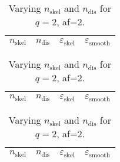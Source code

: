 \documentclass[11pt, oneside]{article}   	%
\newcommand\nskel{n_{\textrm{skel}}}
\newcommand\ndis{n_{\textrm{dis}}}
\newcommand\eskel{\varepsilon_{\textrm{skel}}}
\newcommand\esmooth{\varepsilon_{\textrm{smooth}}}
\begin{document}
\begin{table}[!ht]
\begin{minipage}{.3\linewidth}
\caption{$\lambda = 2.5$}
\centering
{\tiny
\begin{tabular}{|c|c|c|c|}
\hline
$\nskel$ & $\ndis$ & $\eskel$ & $\esmooth$ \\ \hline

\end{tabular}
}
\end{minipage} \hspace{3ex} 
\begin{minipage}{.3\linewidth}
\caption{$\lambda = 5$}
\centering
{\tiny
\begin{tabular}{|c|c|c|c|}
\hline
$\nskel$ & $\ndis$ & $\eskel$ & $\esmooth$ \\ \hline

\end{tabular}
}
\end{minipage} \hspace{3ex}
\begin{minipage}{.3\linewidth}
\caption{$\lambda = 10$}
\centering
\centering
{\tiny
\begin{tabular}{|c|c|c|c|}
\hline
$\nskel$ & $\ndis$ & $\eskel$ & $\esmooth$ \\ \hline

\end{tabular}
}
\end{minipage}
\caption{Varying $\nskel$ and $\ndis$ for $q=2$, af=2.}
\end{table}
\end{document}
